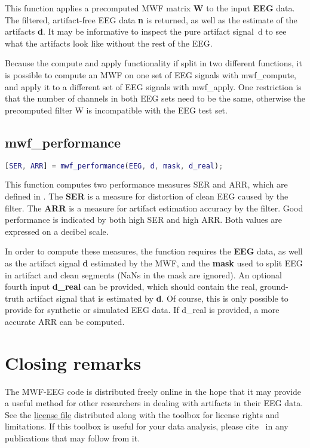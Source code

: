 \documentclass[11pt]{article}
\begin{document}
This function applies a precomputed MWF matrix \textbf{W} to the input \textbf{EEG} data. The filtered, artifact-free EEG data \textbf{n} is returned, as well as the estimate of the artifacts \textbf{d}. It may be informative to inspect the pure artifact signal~d to see what the artifacts look like without the rest of the EEG.

Because the compute and apply functionality if split in two different functions, it is possible to compute an MWF on one set of EEG signals with mwf\_compute, and apply it to a different set of EEG signals with mwf\_apply. One restriction is that the number of channels in both EEG sets need to be the same, otherwise the precomputed filter W is incompatible with the EEG test set.

\subsection{mwf\_performance}

\begin{lstlisting}[frame=single, language=matlab]
[SER, ARR] = mwf_performance(EEG, d, mask, d_real);
\end{lstlisting}

This function computes two performance measures SER and ARR, which are defined in \cite{somers2018generic}. The \textbf{SER} is a measure for distortion of clean EEG caused by the filter. The \textbf{ARR} is a measure for artifact estimation accuracy by the filter. Good performance is indicated by both high SER and high ARR. Both values are expressed on a decibel scale.

In order to compute these measures, the function requires the \textbf{EEG} data, as well as the artifact signal \textbf{d} estimated by the MWF, and the \textbf{mask} used to split EEG in artifact and clean segments (NaNs in the mask are ignored). An optional fourth input \textbf{d\_real} can be provided, which should contain the real, ground-truth artifact signal that is estimated by \textbf{d}. Of course, this is only possible to provide for synthetic or simulated EEG data. If d\_real is provided, a more accurate ARR can be computed.

\section{Closing remarks}

The MWF-EEG code is distributed freely online in the hope that it may provide a useful method for other researchers in dealing with artifacts in their EEG data. See the \href{www.github.com/exporl/mwf-artifact-removal/blob/master/LICENSE.md}{license file} distributed along with the toolbox for license rights and limitations. If this toolbox is useful for your data analysis, please cite~ \cite{somers2018generic} in any publications that may follow from it.
\end{document}
